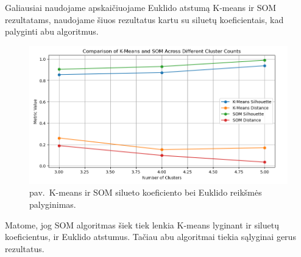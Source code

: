 \documentclass[14pt]{extarticle}
\renewcommand{\thefigure}{\arabic{figure} pav.}
\begin{document}
Galiausiai naudojame apskaičiuojame Euklido atstumą K-means ir SOM rezultatams, naudojame šiuos rezultatus kartu su siluetų koeficientais,
kad palyginti abu algoritmus.

\begin{figure}[!htbp]
	\includegraphics[width=\textwidth]{images/compare/1.png}
	\caption{\thefigure\ K-means ir SOM silueto koeficiento bei Euklido reikšmės palyginimas.}
\end{figure}

Matome, jog SOM algoritmas šiek tiek lenkia K-means lyginant ir siluetų koeficientus, ir Euklido atstumus. Tačiau abu algoritmai
tiekia sąlyginai gerus rezultatus.

\clearpage
\end{document}
